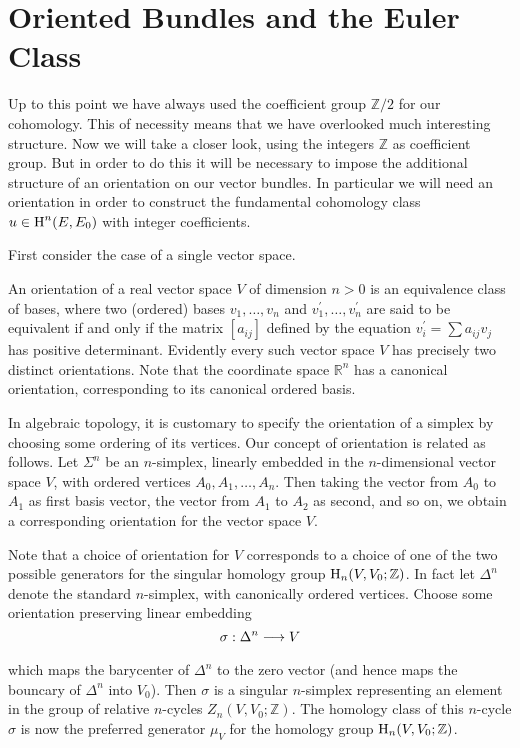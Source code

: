 \documentclass[../main]{subfiles}
\begin{document}
\chapter{Oriented Bundles and the Euler Class}\label{ch:9}
Up to this point we have always used the coefficient group $\mathbb{Z} / 2$ for our cohomology. This of necessity means that we have overlooked much interesting structure. Now we will take a closer look, using the integers $\mathbb{Z}$ as coefficient group. But in order to do this it will be necessary to impose the additional structure of an orientation on our vector bundles. In particular we will need an orientation in order to construct the fundamental cohomology class $u \in \operatorname{H}^{n}(E, E_{0})$ with integer coefficients.

First consider the case of a single vector space.

\begin{definition}
An orientation of a real vector space $V$ of dimension $n>0$ is an equivalence class of bases, where two (ordered) bases $v_{1}, \ldots, v_{n}$ and $v_{1}^{\prime}, \ldots, v_{n}^{\prime}$ are said to be equivalent if and only if the matrix $[a_{i j}]$ defined by the equation $v_{i}^{\prime}=\sum a_{i j} v_{j}$ has positive determinant. Evidently every such vector space $V$ has precisely two distinct orientations. Note that the coordinate space $\mathbb{R}^n$ has a canonical orientation, corresponding to its canonical ordered basis.
\end{definition} 

In algebraic topology, it is customary to specify the orientation of a simplex by choosing some ordering of its vertices. Our concept of orientation is related as follows. Let $\Sigma^{n}$ be an $n$-simplex, linearly embedded in the $n$-dimensional vector space $V$, with ordered vertices $A_{0}, A_{1}, \ldots, A_{n}$. Then taking the vector from $A_{0}$ to $A_{1}$ as first basis vector, the vector from $A_{1}$ to $A_{2}$ as second, and so on, we obtain a corresponding orientation for the vector space $V$.

Note that a choice of orientation for $V$ corresponds to a choice of one of the two possible generators for the singular homology group $\operatorname{H}_{n}(V, V_{0} ; \mathbb{Z})$. In fact let $\Delta^{n}$ denote the standard $n$-simplex, with canonically ordered vertices. Choose some orientation preserving linear embedding
\[
\sigma: \Delta^{n} \varrightarrow{} V
\]
which maps the barycenter of $\Delta^{n}$ to the zero vector (and hence maps the bouncary of $\Delta^{n}$ into $V_{0}$). Then $\sigma$ is a singular $n$-simplex representing an element in the group of relative $n$-cycles $Z_{n}(V, V_{0} ; \mathbb{Z})$. The homology class of this $n$-cycle $\sigma$ is now the preferred generator $\mu_{V}$ for the homology group $\operatorname{H}_{n}(V, V_{0} ; \mathbb{Z})$.
\end{document}
